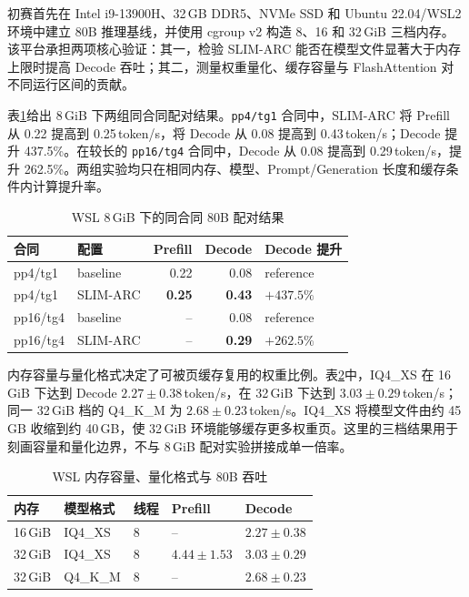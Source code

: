 \documentclass[a4paper]{article}
\begin{document}
初赛首先在 Intel i9-13900H、32\,GB DDR5、NVMe SSD 和 Ubuntu 22.04/WSL2 环境中建立 80B 推理基线，并使用 cgroup v2 构造 8、16 和 32\,GiB 三档内存。该平台承担两项核心验证：其一，检验 SLIM-ARC 能否在模型文件显著大于内存上限时提高 Decode 吞吐；其二，测量权重量化、缓存容量与 FlashAttention 对不同运行区间的贡献。

表\ref{tab:wsl-limited}给出 8\,GiB 下两组同合同配对结果。\texttt{pp4/tg1} 合同中，SLIM-ARC 将 Prefill 从 0.22 提高到 0.25\,token/s，将 Decode 从 0.08 提高到 0.43\,token/s；Decode 提升 437.5\%。在较长的 \texttt{pp16/tg4} 合同中，Decode 从 0.08 提高到 0.29\,token/s，提升 262.5\%。两组实验均只在相同内存、模型、Prompt/Generation 长度和缓存条件内计算提升率。

\begin{table}[H]
\centering
\small
\caption{WSL 8\,GiB 下的同合同 80B 配对结果}
\label{tab:wsl-limited}
\begin{tabular}{llrrl}
\toprule
合同 & 配置 & Prefill & Decode & Decode 提升 \\
\midrule
pp4/tg1 & baseline & 0.22 & 0.08 & reference \\
pp4/tg1 & SLIM-ARC & \textbf{0.25} & \textbf{0.43} & \textbf{$+437.5\%$} \\
pp16/tg4 & baseline & -- & 0.08 & reference \\
pp16/tg4 & SLIM-ARC & -- & \textbf{0.29} & \textbf{$+262.5\%$} \\
\bottomrule
\end{tabular}
\end{table}

内存容量与量化格式决定了可被页缓存复用的权重比例。表\ref{tab:wsl-capacity}中，IQ4\_XS 在 16\,GiB 下达到 Decode $2.27\pm0.38$\,token/s，在 32\,GiB 下达到 $3.03\pm0.29$\,token/s；同一 32\,GiB 档的 Q4\_K\_M 为 $2.68\pm0.23$\,token/s。IQ4\_XS 将模型文件由约 45\,GB 收缩到约 40\,GB，使 32\,GiB 环境能够缓存更多权重页。这里的三档结果用于刻画容量和量化边界，不与 8\,GiB 配对实验拼接成单一倍率。

\begin{table}[H]
\centering
\small
\caption{WSL 内存容量、量化格式与 80B 吞吐}
\label{tab:wsl-capacity}
\begin{tabular}{lllll}
\toprule
内存 & 模型格式 & 线程 & Prefill & Decode \\
\midrule
16\,GiB & IQ4\_XS & 8 & -- & $2.27\pm0.38$ \\
32\,GiB & IQ4\_XS & 8 & $4.44\pm1.53$ & $3.03\pm0.29$ \\
32\,GiB & Q4\_K\_M & 8 & -- & $2.68\pm0.23$ \\
\bottomrule
\end{tabular}
\end{table}
\end{document}
